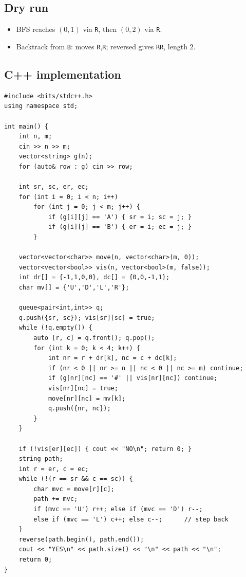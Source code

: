 \subsection*{Dry run}


\begin{itemize}
  \item BFS reaches $(0,1)$ via \texttt{R}, then $(0,2)$ via \texttt{R}.
  \item Backtrack from \texttt{B}: moves \texttt{R},\texttt{R}; reversed
        gives \texttt{RR}, length $2$.
\end{itemize}

\subsection*{C++ implementation}

\begin{lstlisting}
#include <bits/stdc++.h>
using namespace std;

int main() {
    int n, m;
    cin >> n >> m;
    vector<string> g(n);
    for (auto& row : g) cin >> row;

    int sr, sc, er, ec;
    for (int i = 0; i < n; i++)
        for (int j = 0; j < m; j++) {
            if (g[i][j] == 'A') { sr = i; sc = j; }
            if (g[i][j] == 'B') { er = i; ec = j; }
        }

    vector<vector<char>> move(n, vector<char>(m, 0));
    vector<vector<bool>> vis(n, vector<bool>(m, false));
    int dr[] = {-1,1,0,0}, dc[] = {0,0,-1,1};
    char mv[] = {'U','D','L','R'};

    queue<pair<int,int>> q;
    q.push({sr, sc}); vis[sr][sc] = true;
    while (!q.empty()) {
        auto [r, c] = q.front(); q.pop();
        for (int k = 0; k < 4; k++) {
            int nr = r + dr[k], nc = c + dc[k];
            if (nr < 0 || nr >= n || nc < 0 || nc >= m) continue;
            if (g[nr][nc] == '#' || vis[nr][nc]) continue;
            vis[nr][nc] = true;
            move[nr][nc] = mv[k];
            q.push({nr, nc});
        }
    }

    if (!vis[er][ec]) { cout << "NO\n"; return 0; }
    string path;
    int r = er, c = ec;
    while (!(r == sr && c == sc)) {
        char mvc = move[r][c];
        path += mvc;
        if (mvc == 'U') r++; else if (mvc == 'D') r--;
        else if (mvc == 'L') c++; else c--;      // step back
    }
    reverse(path.begin(), path.end());
    cout << "YES\n" << path.size() << "\n" << path << "\n";
    return 0;
}
\end{lstlisting}

